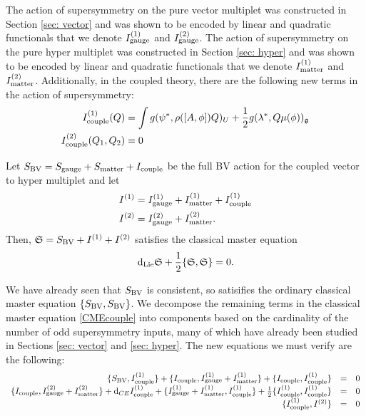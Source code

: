 \documentclass[10pt, oneside]{article}
\begin{document}
The action of supersymmetry on the pure vector multiplet was constructed in Section \ref{sec: vector} and was shown to be encoded by linear and quadratic functionals that we denote $I^{(1)}_{\rm gauge}$ and $I^{(2)}_{\rm gauge}$. 
The action of supersymmetry on the pure hyper multiplet was constructed in Section \ref{sec: hyper} and was shown to be encoded by linear and quadratic functionals that we denote $I^{(1)}_{\rm matter}$ and $I^{(2)}_{\rm matter}$. 
Additionally, in the coupled theory, there are the following new terms in the action of supersymmetry:
\begin{align*}
I^{(1)}_{\rm couple} (Q) & = \int g (\psi^*, \rho([A, \phi]) Q)_U + \frac{1}{2} g (\lambda^*, Q \mu(\phi))_\mathfrak g \\
I_{\rm couple}^{(2)} (Q_1 , Q_2) & = 0 
\end{align*}

\begin{thm}
Let $S_{\rm BV} = S_{\rm gauge} + S_{\rm matter} + I_{\rm couple}$ be the full BV action for the coupled vector to hyper multiplet and let
\begin{align*}
I^{(1)} & = I^{(1)}_{\rm gauge} + I^{(1)}_{\rm matter} + I^{(1)}_{\rm couple} \\
I^{(2)} & = I^{(2)}_{\rm gauge} + I^{(2)}_{\rm matter} .
\end{align*}
Then, $\mathfrak S = S_{\rm BV} + I^{(1)} + I^{(2)}$ satisfies the classical master equation
\begin{equation}\label{CMEcouple}
{\rm d}_{\rm Lie} \mathfrak S + \frac{1}{2} \{\mathfrak S, \mathfrak S\} = 0 .
\end{equation}
\end{thm}

We have already seen that $S_{\rm BV}$ is consistent, so satisifies the ordinary classical master equation $\{S_{\rm BV}, S_{\rm BV}\}$. 
We decompose the remaining terms in the classical master equation \ref{CMEcouple} into components based on the cardinality of the number of odd supersymmetry inputs, many of which have already been studied in Sections \ref{sec: vector} and \ref{sec: hyper}. 
The new equations we must verify are the following:
\begin{equation}\label{CMEcouple}
\begin{array}{rrrrrr}
\{S_{\rm BV} , I^{(1)}_{\rm couple}\} + \{I_{\rm couple}, I^{(1)}_{\rm gauge} + I^{(1)}_{\rm matter}\} + \{I_{\rm couple}, I^{(1)}_{\rm couple}\} & = & 0 \\ 
\{I_{\rm couple}, I^{(2)}_{\rm gauge} + I^{(2)}_{\rm matter}\} + {\rm d}_{CE} I^{(1)}_{\rm couple} + \{I^{(1)}_{\rm gauge} + I^{(1)}_{\rm matter}, I^{(1)}_{\rm couple}\} + \frac{1}{2} \{I_{\rm couple}^{(1)}, I_{\rm couple}^{(1)}\} & = & 0 \\
\{I_{\rm couple}^{(1)}, I^{(2)}\} & =& 0 \\
\end{array}
\end{equation}
\end{document}
